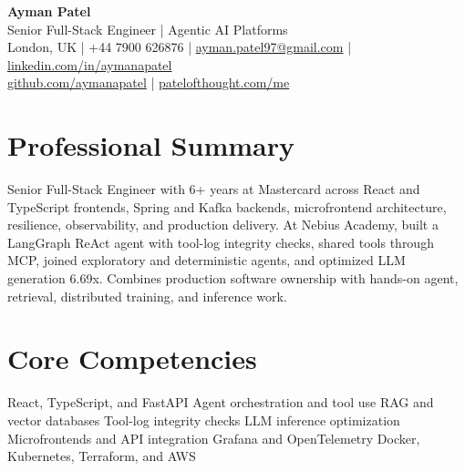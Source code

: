 \documentclass[a4paper,10pt]{article}
\begin{document}
\begin{center}
  {\LARGE \textbf{Ayman Patel}}\\
  \vspace{2pt}
  {\small Senior Full-Stack Engineer | Agentic AI Platforms}\\
  {\small London, UK \quad | \quad +44 7900 626876 \quad | \quad
  \href{mailto:ayman.patel97@gmail.com}{ayman.patel97@gmail.com} \quad | \quad
  \href{https://linkedin.com/in/aymanapatel}{linkedin.com/in/aymanapatel}}\\
  {\small \href{https://github.com/aymanapatel}{github.com/aymanapatel} \quad | \quad
  \href{https://patelofthought.com/me}{patelofthought.com/me}}
\end{center}

\section{Professional Summary}
{\small Senior Full-Stack Engineer with 6+ years at Mastercard across React and TypeScript frontends, Spring and Kafka backends, microfrontend architecture, resilience, observability, and production delivery. At Nebius Academy, built a LangGraph ReAct agent with tool-log integrity checks, shared tools through MCP, joined exploratory and deterministic agents, and optimized LLM generation 6.69x. Combines production software ownership with hands-on agent, retrieval, distributed training, and inference work.}

\section{Core Competencies}
{\small React, TypeScript, and FastAPI \textbar{} Agent orchestration and tool use \textbar{} RAG and vector databases \textbar{} Tool-log integrity checks \textbar{} LLM inference optimization \textbar{} Microfrontends and API integration \textbar{} Grafana and OpenTelemetry \textbar{} Docker, Kubernetes, Terraform, and AWS}
\end{document}
